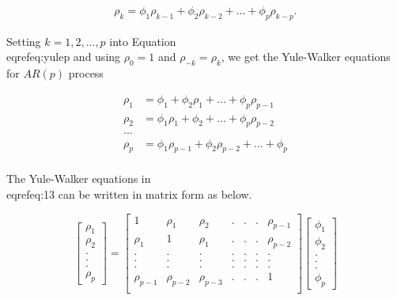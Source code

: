 \documentclass[11pt,a4paper,]{article}
\begin{document}
{\begin{align}
\label{eq:yulep}
\rho_k = \phi_1\rho_{k-1}+\phi_2 \rho_{k-2} + ... + \phi_p \rho_{k-p}.
\end{align}


Setting $k=1, 2, ..., p$ into Equation \\eqref{eq:yulep} and using $\rho_0=1$ and $\rho_{-k}=\rho_k$, we get the Yule-Walker equations for $AR(p)$ process


\begin{equation}
  \label{eq:13}
\begin{aligned}
  \rho_1 &= \phi_1+\phi_2 \rho_{1} + ... + \phi_p \rho_{p-1}\\
  \rho_2 &= \phi_1 \rho_1+\phi_2  + ... + \phi_p \rho_{p-2}\\
  ... \\
  \rho_p &= \phi_1 \rho_{p-1} +\phi_2 \rho_{p-2}  + ... + \phi_p \\
\end{aligned}
\end{equation}

The Yule-Walker equations in \\eqref{eq:13} can be written in matrix form as below.

$$\left[\begin{array}
{r}
\rho_1  \\
\rho_2  \\
.\\
.\\
.\\
\rho_p
\end{array}\right] = \left[\begin{array}
{rrrrrrr}
1 & \rho_1 & \rho_2 & .&.&.& \rho_{p-1} \\
\rho_1 & 1 & \rho_1 & .&.&.& \rho_{p-2} \\
. & . & . & .&.&.& . \\
. & . & . & .&.&.& . \\
. & . & . & .&.&.& . \\
\rho_{p-1} & \rho_{p-2} & \rho_{p-3} & .&.&.& 1 \\
\end{array}\right] \left[\begin{array}
{r}
\phi_1  \\
\phi_2  \\
.\\
.\\
.\\
\phi_p
\end{array}\right]
$$

}
\end{document}
